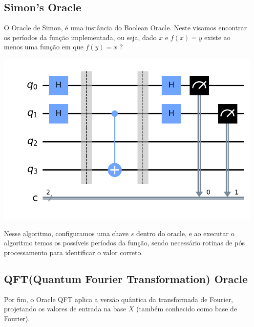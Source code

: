 \documentclass{article}
\begin{document}
\subsection{Simon's Oracle}

O Oracle de Simon, é uma instância do Boolean Oracle. Neste visamos encontrar os períodos da função implementada, ou seja, dado $x$ e $f(x) = y$ existe ao menos uma função em que $f(y) = x$ ?


\begin{center}
	\includegraphics[scale=0.3]{simons.png}
	\label{fig:simons-oracle}
\end{center}

Nesse algoritmo, configuramos uma chave $s$ dentro do oracle, e ao executar o algoritmo temos os possíveis períodos da função, sendo necessário rotinas de pós processamento para identificar o valor correto.

\subsection{QFT(Quantum Fourier Transformation) Oracle}

Por fim, o Oracle QFT aplica a versão quântica da transformada de Fourier, projetando os valores de entrada na base $X$ (também conhecido como base de Fourier).
\end{document}
